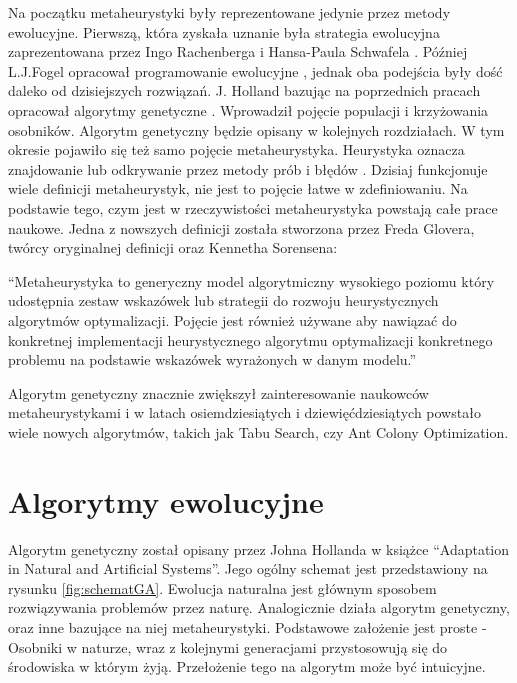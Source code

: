 \documentclass[twoside]{iisthesis}
\begin{document}
Na początku metaheurystyki były reprezentowane jedynie przez metody ewolucyjne. Pierwszą, która zyskała uznanie była strategia ewolucyjna zaprezentowana przez Ingo Rachenberga i Hansa-Paula Schwafela \cite{Rechenberg1989}. Później L.J.Fogel opracował programowanie ewolucyjne \cite{Fogel:2011}, jednak oba podejścia były dość daleko od dzisiejszych rozwiązań. J. Holland bazując na poprzednich pracach opracował algorytmy genetyczne \cite{Yang:2011}. Wprowadził pojęcie populacji i krzyżowania osobników. Algorytm genetyczny będzie opisany w kolejnych rozdziałach. W tym okresie pojawiło się też samo pojęcie metaheurystyka. Heurystyka oznacza znajdowanie lub odkrywanie przez metody prób i błędów \cite{Yang:2011}. Dzisiaj funkcjonuje wiele definicji metaheurystyk, nie jest to pojęcie łatwe w zdefiniowaniu. Na podstawie tego, czym jest w rzeczywistości metaheurystyka powstają całe prace naukowe. Jedna z nowszych definicji została stworzona przez Freda Glovera, twórcy oryginalnej definicji oraz Kennetha Sorensena: 

``Metaheurystyka to generyczny model algorytmiczny wysokiego poziomu który udostępnia zestaw wskazówek lub strategii do rozwoju heurystycznych algorytmów optymalizacji. Pojęcie jest również używane aby nawiązać do konkretnej implementacji heurystycznego algorytmu optymalizacji konkretnego problemu na podstawie wskazówek wyrażonych w danym modelu.''

Algorytm genetyczny znacznie zwiększył zainteresowanie naukowców metaheurystykami i w latach osiemdziesiątych i dziewięćdziesiątych powstało wiele nowych algorytmów, takich jak Tabu Search, czy Ant Colony Optimization.

\section{Algorytmy ewolucyjne}

Algorytm genetyczny został opisany przez Johna Hollanda w książce ``Adaptation in Natural and Artificial Systems''. Jego ogólny schemat jest przedstawiony na rysunku \ref{fig:schematGA}. Ewolucja naturalna jest głównym sposobem rozwiązywania problemów przez naturę. Analogicznie działa algorytm genetyczny, oraz inne bazujące na niej metaheurystyki. Podstawowe założenie jest proste - Osobniki w naturze, wraz z kolejnymi generacjami przystosowują się do środowiska w którym żyją. Przełożenie tego na algorytm może być intuicyjne.
\end{document}
